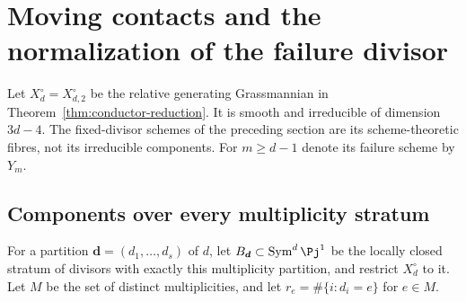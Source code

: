 \section{Moving contacts and the normalization of the failure divisor}
\label{sec:moving-contact-normalization}
Let $X_d^\circ=X_{d,2}^\circ$ be the relative generating Grassmannian
in Theorem~\ref{thm:conductor-reduction}. It is smooth and irreducible
of dimension $3d-4$. The fixed-divisor schemes of the preceding
section are its scheme-theoretic fibres, not its irreducible
components. For $m\ge d-1$ denote its failure scheme by $Y_m$.

\subsection{Components over every multiplicity stratum}
For a partition $\boldsymbol d=(d_1,\ldots,d_s)$ of $d$, let
$B_{\boldsymbol d}\subset\operatorname{Sym}^d\Pj^1$ be the locally
closed stratum of divisors with exactly this multiplicity partition,
and restrict $X_d^\circ$ to it. Let $M$ be the set of distinct
multiplicities, and let $r_e=\#\{i:d_i=e\}$ for $e\in M$.


